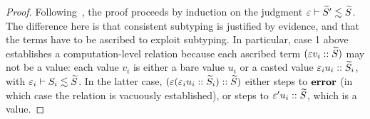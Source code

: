 \documentclass[authoryear,sort&compress,9pt,twocolumn,nocopyrightspace]{sigplanconf}
\newcommand{\csub}{\lesssim}
\newcommand{\?}{\textsf{\upshape ?}} \newcommand{\consistent}[1]{\widetilde{#1}}
\newcommand{\cast}[2]{\evcast{\evpr{#1}}{#2}}
\newcommand{\error}{\textup{\textbf{error}}}
\newcommand{\ev}{\varepsilon}
\newcommand{\evcast}[2]{#1#2}
\newcommand{\evpr}[1]{\braket{#1}}
\renewcommand{\cast}[2]{#1#2}
\begin{document}
\begin{proof}
Following~\citet{zdancewic}, the proof proceeds by induction on the
judgment $\ev |- \cS' \csub \cS$. The difference here is that
consistent subtyping is justified by evidence, and that the terms have
to be ascribed to exploit subtyping. In particular, case 1 above
establishes a computation-level relation because each ascribed term $(\cast{\ev}{v_i ::
  \cS})$ may not be a value: each value $v_i$
is either a bare value $u_i$ or a casted value $\cast{\ev_i}{u_i ::
  \cS_i}$, with $\ev_i |- S_i
\csub \cS$. In
the latter case, $(\cast{\ev}{(\cast{\ev_i}{u_i :: \cS_i}) :: \cS})$
either steps to $\error$ (in which case the relation is vacuously
established), or steps to $\cast{\ev'}{u_i :: \cS}$, which is a
value.
\end{proof}
\end{document}
